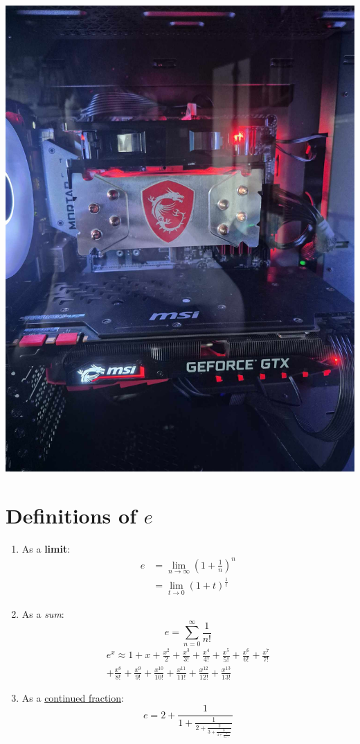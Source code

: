 \documentclass{report}
\begin{document}
\includegraphics[scale=0.1]{cooler.jpg}

\section{Definitions of $e$}
\begin{enumerate}
    \item As a \textbf{limit}:
          \begin{equation}
              \begin{split}
                  e & = \lim_{n \to \infty} \left(1 + \frac{1}{n}\right)^n \\
                    & =\lim_{t \to 0}(1 + t)^{\frac{1}{t}}
              \end{split}
          \end{equation}
    \item As a \textit{sum}:
          \[e = \sum_{n=0}^{\infty}\frac{1}{n!}\]
          \begin{multline}
              e^x \approx 1 + x + \frac{x^2}{2} + \frac{x^3}{3!} + \frac{x^4}{4!}
              + \frac{x^5}{5!} + \frac{x^6}{6!} + \frac{x^7}{7!} \\ + \frac{x^8}{8!} + \frac{x^9}{9!} + \frac{x^{10}}{10!} + \frac{x^{11}}{11!} + \frac{x^{12}}{12!} + \frac{x^{13}}{13!}
          \end{multline}
    \item As a \underline{continued fraction}:
          \[e =2 + \frac{1}{1 + \frac{1}{2 + \frac{2}{3 + \frac{3}{4 + \frac{4}{5 + \ddots}}}}}\]
\end{enumerate}
\end{document}
